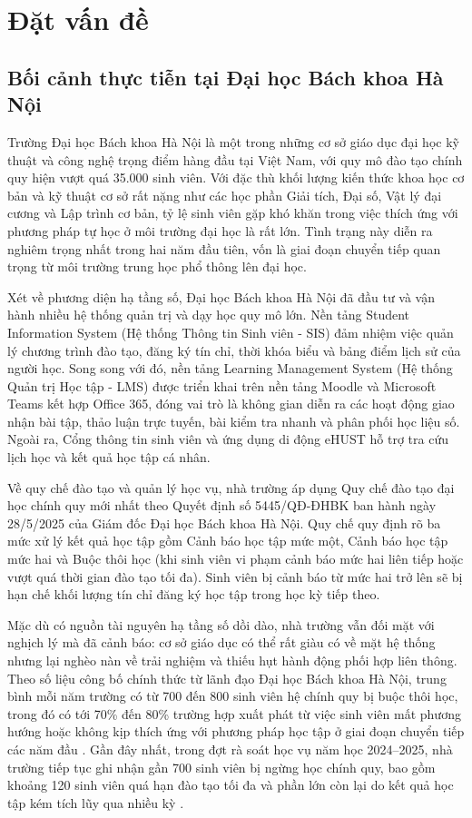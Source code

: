 \section{Đặt vấn đề}

\subsection{Bối cảnh thực tiễn tại Đại học Bách khoa Hà Nội}
Trường Đại học Bách khoa Hà Nội là một trong những cơ sở giáo dục đại học kỹ thuật và công nghệ trọng điểm hàng đầu tại Việt Nam, với quy mô đào tạo chính quy hiện vượt quá 35.000 sinh viên. Với đặc thù khối lượng kiến thức khoa học cơ bản và kỹ thuật cơ sở rất nặng như các học phần Giải tích, Đại số, Vật lý đại cương và Lập trình cơ bản, tỷ lệ sinh viên gặp khó khăn trong việc thích ứng với phương pháp tự học ở môi trường đại học là rất lớn. Tình trạng này diễn ra nghiêm trọng nhất trong hai năm đầu tiên, vốn là giai đoạn chuyển tiếp quan trọng từ môi trường trung học phổ thông lên đại học.

Xét về phương diện hạ tầng số, Đại học Bách khoa Hà Nội đã đầu tư và vận hành nhiều hệ thống quản trị và dạy học quy mô lớn. Nền tảng Student Information System (Hệ thống Thông tin Sinh viên - SIS) đảm nhiệm việc quản lý chương trình đào tạo, đăng ký tín chỉ, thời khóa biểu và bảng điểm lịch sử của người học. Song song với đó, nền tảng Learning Management System (Hệ thống Quản trị Học tập - LMS) được triển khai trên nền tảng Moodle và Microsoft Teams kết hợp Office 365, đóng vai trò là không gian diễn ra các hoạt động giao nhận bài tập, thảo luận trực tuyến, bài kiểm tra nhanh và phân phối học liệu số. Ngoài ra, Cổng thông tin sinh viên và ứng dụng di động eHUST hỗ trợ tra cứu lịch học và kết quả học tập cá nhân.

Về quy chế đào tạo và quản lý học vụ, nhà trường áp dụng Quy chế đào tạo đại học chính quy mới nhất theo Quyết định số 5445/QĐ-ĐHBK ban hành ngày 28/5/2025 của Giám đốc Đại học Bách khoa Hà Nội. Quy chế quy định rõ ba mức xử lý kết quả học tập gồm Cảnh báo học tập mức một, Cảnh báo học tập mức hai và Buộc thôi học (khi sinh viên vi phạm cảnh báo mức hai liên tiếp hoặc vượt quá thời gian đào tạo tối đa). Sinh viên bị cảnh báo từ mức hai trở lên sẽ bị hạn chế khối lượng tín chỉ đăng ký học tập trong học kỳ tiếp theo.

Mặc dù có nguồn tài nguyên hạ tầng số dồi dào, nhà trường vẫn đối mặt với nghịch lý mà \citet{uskov2018} đã cảnh báo: cơ sở giáo dục có thể rất giàu có về mặt hệ thống nhưng lại nghèo nàn về trải nghiệm và thiếu hụt hành động phối hợp liên thông. Theo số liệu công bố chính thức từ lãnh đạo Đại học Bách khoa Hà Nội, trung bình mỗi năm trường có từ 700 đến 800 sinh viên hệ chính quy bị buộc thôi học, trong đó có tới 70\% đến 80\% trường hợp xuất phát từ việc sinh viên mất phương hướng hoặc không kịp thích ứng với phương pháp học tập ở giai đoạn chuyển tiếp các năm đầu \citep{phungnhung2022}. Gần đây nhất, trong đợt rà soát học vụ năm học 2024--2025, nhà trường tiếp tục ghi nhận gần 700 sinh viên bị ngừng học chính quy, bao gồm khoảng 120 sinh viên quá hạn đào tạo tối đa và phần lớn còn lại do kết quả học tập kém tích lũy qua nhiều kỳ \citep{tienphong2024}.

